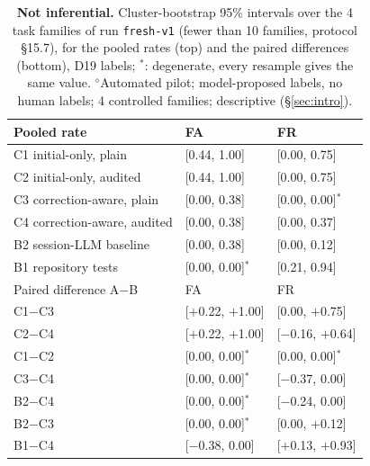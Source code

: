 \begin{table}[t]\centering\footnotesize
\caption{\textbf{Not inferential.} Cluster-bootstrap 95\% intervals over the 4 task families of run \texttt{fresh-v1} (fewer than 10 families, protocol \S15.7), for the pooled rates (top) and the paired differences (bottom), D19 labels; $^{*}$: degenerate, every resample gives the same value. $^{\diamond}$Automated pilot; model-proposed labels, no human labels; 4 controlled families; descriptive (\S\ref{sec:intro}).}\label{tab:fresh-boot}
\begin{tabular}{lll}\toprule Pooled rate & FA & FR \\\midrule
C1 initial-only, plain & [0.44, 1.00] & [0.00, 0.75] \\
C2 initial-only, audited & [0.44, 1.00] & [0.00, 0.75] \\
C3 correction-aware, plain & [0.00, 0.38] & [0.00, 0.00]$^{*}$ \\
C4 correction-aware, audited & [0.00, 0.38] & [0.00, 0.37] \\
B2 session-LLM baseline & [0.00, 0.38] & [0.00, 0.12] \\
B1 repository tests & [0.00, 0.00]$^{*}$ & [0.21, 0.94] \\\midrule
Paired difference A$-$B & FA & FR \\\midrule
C1$-$C3 & [\ensuremath{+}0.22, \ensuremath{+}1.00] & [0.00, \ensuremath{+}0.75] \\
C2$-$C4 & [\ensuremath{+}0.22, \ensuremath{+}1.00] & [\ensuremath{-}0.16, \ensuremath{+}0.64] \\
C1$-$C2 & [0.00, 0.00]$^{*}$ & [0.00, 0.00]$^{*}$ \\
C3$-$C4 & [0.00, 0.00]$^{*}$ & [\ensuremath{-}0.37, 0.00] \\
B2$-$C4 & [0.00, 0.00]$^{*}$ & [\ensuremath{-}0.24, 0.00] \\
B2$-$C3 & [0.00, 0.00]$^{*}$ & [0.00, \ensuremath{+}0.12] \\
B1$-$C4 & [\ensuremath{-}0.38, 0.00] & [\ensuremath{+}0.13, \ensuremath{+}0.93] \\
\bottomrule\end{tabular}\end{table}
